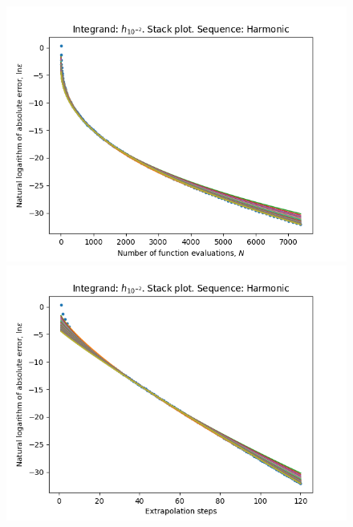 \begin{figure}[H]
\centering
\begin{minipage}{0.45\textwidth}
\centering
\includegraphics[scale=0.45]{../results/romberg_plots/h_hundredth_hp_harmonic_stack.png}
\end{minipage}
\begin{minipage}{0.45\textwidth}
\centering
\includegraphics[scale=0.45]{../results/romberg_plots/h_hundredth_hp_harmonic_steps_stack.png}
\end{minipage}
\end{figure}

